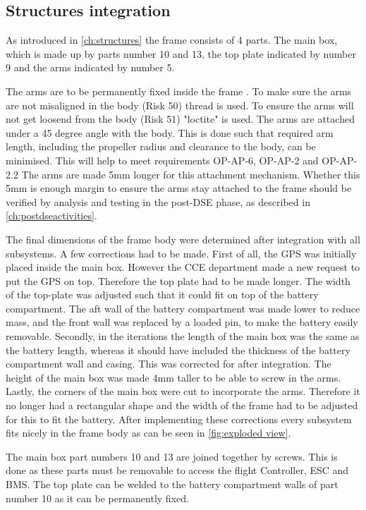 \subsection{Structures integration}
As introduced in \autoref{ch:structures} the frame consists of 4 parts. The main box, which is made up by parts number 10 and 13, the top plate indicated by number 9 and the arms indicated by number 5.

The arms are to be permanently fixed inside the frame \cite{midterm}. To make sure the arms are not misaligned in the body (Risk 50) thread is used. To ensure the arms will not get loosend from the body (Risk 51) "loctite" \cite{loctite} is used. The arms are attached under a 45 degree angle with the body. This is done such that required arm length, including the propeller radius and clearance to the body, can be minimised. This will help to meet requirements OP-AP-6, OP-AP-2 and OP-AP-2.2 The arms are made 5mm longer for this attachment mechanism. Whether this 5mm is enough margin to ensure the arms stay attached to the frame should be verified by analysis and testing in the post-DSE phase, as described in \autoref{ch:postdseactivities}.

The final dimensions of the frame body were determined after integration with all subsystems. A few corrections had to be made. First of all, the GPS was initially placed inside the main box. However the CCE department made a new request to put the GPS on top. Therefore the top plate had to be made longer. The width of the top-plate was adjusted such that it could fit on top of the battery compartment. The aft wall of the battery compartment was made lower to reduce mass, and the front wall was replaced by a loaded pin, to make the battery easily removable. Secondly, in the iterations the length of the main box was the same as the battery length, whereas it should have included the thickness of the battery compartment wall and casing. This was corrected for after integration. The height of the main box was made 4mm taller to be able to screw in the arms. Lastly, the corners of the main box were cut to incorporate the arms. Therefore it no longer had a rectangular shape and the width of the frame had to be adjusted for this to fit the battery. After implementing these corrections every subsystem fits nicely in the frame body as can be seen in \autoref{fig:exploded view}.

The main box part numbers 10 and 13 are joined together by screws. This is done as these parts must be removable to access the flight Controller, ESC and BMS. The top plate can be welded to the battery compartment walls of part number 10 as it can be permanently fixed.

